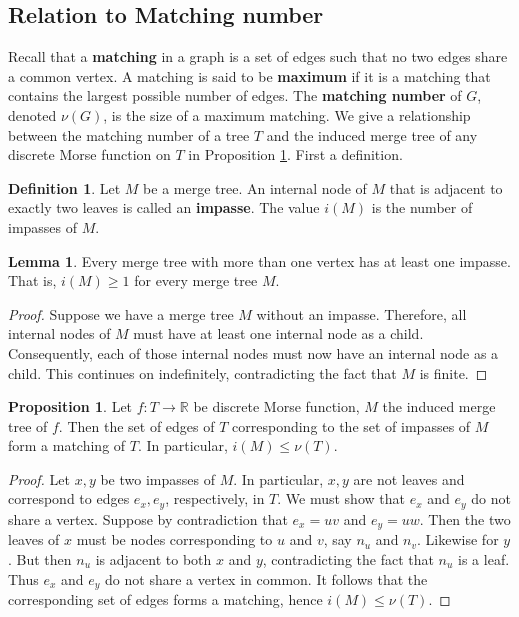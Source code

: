 \documentclass{article}
\theoremstyle{definition}
\newtheorem{lemma}{Lemma}[section]
\newcommand{\RR}    {\mathbb{R}}
\newtheorem{defn}[thm]  {Definition}
\newtheorem{prop}[thm]  {Proposition}
\begin{document}
\subsection{Relation to Matching number}

Recall that a \textbf{matching} in a graph is a set of edges such that no two edges share a common vertex. A matching is said to be \textbf{maximum} if it is a matching that contains the largest possible number of edges.  The \textbf{matching number} of $G$, denoted $\nu(G)$, is the size of a maximum matching.  We give a relationship between the matching number of a tree $T$ and the induced merge tree of any discrete Morse function on $T$ in Proposition \ref{prop: impasse matching}.  First a definition.

\begin{defn}
Let $M$ be a merge tree. An internal node of $M$ that is adjacent to exactly two leaves is called an \textbf{impasse}. The value $i(M)$ is the number of impasses of $M$.
\end{defn}

\begin{lemma}\label{lem: one impasse}
Every merge tree with more than one vertex has at least one impasse.  That is, $i(M) \ge 1$ for every merge tree $M$.
\end{lemma}
\begin{proof}
Suppose we have a merge tree $M$ without an impasse.  Therefore, all internal nodes of $M$ must have at least one internal node as a child.  Consequently, each of those internal nodes must now have an internal node as a child.  This continues on indefinitely, contradicting the fact that $M$ is finite.
\end{proof}



\begin{prop}\label{prop: impasse matching} Let $f\colon T \to \RR$ be discrete Morse function, $M$ the induced merge tree of $f$.  Then the set of edges of $T$ corresponding to the set of impasses of $M$ form a matching of $T$.  In particular, $i(M)\leq \nu(T)$.
\end{prop}

\begin{proof} Let $x,y$ be two impasses of $M$.  In particular, $x,y$ are not leaves and correspond to edges $e_x,e_y$, respectively, in $T$. We must show that $e_x$ and $e_y$ do not share a vertex. Suppose by contradiction that $e_x=uv$ and $e_y=uw$. Then the two leaves of $x$ must be nodes corresponding to $u$ and $v$, say $n_u$ and $n_v$.  Likewise for $y$. But then $n_u$ is adjacent to both $x$ and $y$, contradicting the fact that $n_u$ is a leaf.  Thus $e_x$ and $e_y$ do not share a vertex in common.  It follows that the corresponding set of edges forms a matching, hence $i(M)\leq \nu(T)$.
\end{proof}
\end{document}
